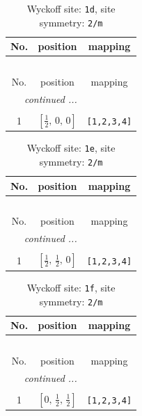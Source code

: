 \documentclass[fleqn,8pt]{jsarticle}
\begin{document}
\renewcommand{\arraystretch}{1.2}
\begin{longtable}{ccc}
\caption{Wyckoff site: {\tt 1d}, site symmetry: {\tt 2/m}}
 \\
 \hline \hline
No. & position & mapping \\ \hline \endfirsthead

\multicolumn{2}{l}{\tablename\ \thetable{}} \\
 \hline \hline
No. & position & mapping \\ \hline \endhead

 \hline \hline
\multicolumn{2}{r}{\footnotesize\it continued ...} \\ \endfoot

 \hline \hline
\multicolumn{2}{r}{} \\ \endlastfoot

1 & $\left[ \frac{1}{2},\, 0,\, 0 \right]$ & {\tt [1,2,3,4]} \\
\end{longtable}
\renewcommand{\arraystretch}{1.2}
\begin{longtable}{ccc}
\caption{Wyckoff site: {\tt 1e}, site symmetry: {\tt 2/m}}
 \\
 \hline \hline
No. & position & mapping \\ \hline \endfirsthead

\multicolumn{2}{l}{\tablename\ \thetable{}} \\
 \hline \hline
No. & position & mapping \\ \hline \endhead

 \hline \hline
\multicolumn{2}{r}{\footnotesize\it continued ...} \\ \endfoot

 \hline \hline
\multicolumn{2}{r}{} \\ \endlastfoot

1 & $\left[ \frac{1}{2},\, \frac{1}{2},\, 0 \right]$ & {\tt [1,2,3,4]} \\
\end{longtable}
\renewcommand{\arraystretch}{1.2}
\begin{longtable}{ccc}
\caption{Wyckoff site: {\tt 1f}, site symmetry: {\tt 2/m}}
 \\
 \hline \hline
No. & position & mapping \\ \hline \endfirsthead

\multicolumn{2}{l}{\tablename\ \thetable{}} \\
 \hline \hline
No. & position & mapping \\ \hline \endhead

 \hline \hline
\multicolumn{2}{r}{\footnotesize\it continued ...} \\ \endfoot

 \hline \hline
\multicolumn{2}{r}{} \\ \endlastfoot

1 & $\left[ 0,\, \frac{1}{2},\, \frac{1}{2} \right]$ & {\tt [1,2,3,4]} \\
\end{longtable}
\end{document}
